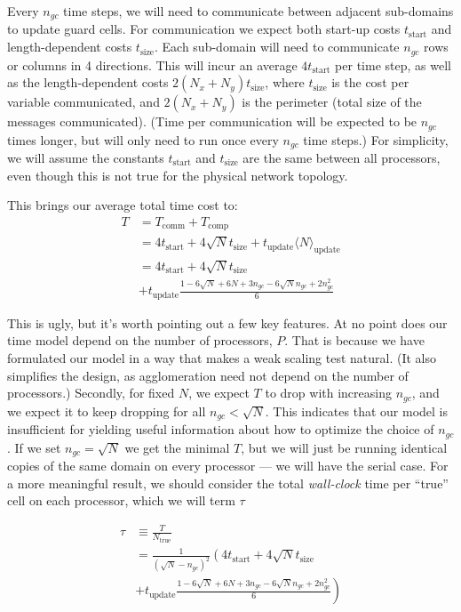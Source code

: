 \documentclass[iop, apj]{emulateapj}
\begin{document}
Every $n_{gc}$ time steps, we will need to communicate between adjacent sub-domains to update guard cells.
For communication we expect both start-up costs $t_\mathrm{start}$ and length-dependent costs $t_\mathrm{size}$.  Each sub-domain will need to communicate $n_{gc}$ rows or columns in 4 directions. This will incur an average $4 t_\mathrm{start}$ per time step, as well as the length-dependent costs $2 (N_x + N_y) t_\mathrm{size}$, where $t_\mathrm{size}$ is the cost per variable communicated, and $2 (N_x + N_y)$ is the perimeter (total size of the messages communicated). (Time per communication will be expected to be $n_{gc}$ times longer, but will only need to run once every $n_{gc}$ time steps.) For simplicity, we will assume the constants $t_\mathrm{start}$ and $t_\mathrm{size}$ are the same between all processors, even though this is not true for the physical network topology.

This brings our average total time cost to:
\begin{align}
	T &=  T_\mathrm{comm} + T_\mathrm{comp}
	\\
	&=  4 t_\mathrm{start} + 4\sqrt{N} t_\mathrm{size} + t_\mathrm{update} \langle N \rangle_\mathrm{update}
	\\
	&= 4 t_\mathrm{start} + 4\sqrt{N} t_\mathrm{size} 
	\\ \nonumber &+ t_\mathrm{update} \frac{1 - 6 \sqrt{N} + 6 N + 3 n_{gc} - 6 \sqrt{N} n_{gc} + 2 n_{gc}^2}{6}
\end{align}

This is ugly, but it's worth pointing out a few key features. At no point does our time model depend on the number of processors, $P$.  That is because we have formulated our model in a way that makes a weak scaling test natural. (It also simplifies the design, as agglomeration need not depend on the number of processors.)
Secondly, for fixed $N$, we expect $T$ to drop with increasing $n_{gc}$, and we expect it to keep dropping for all $n_{gc} < \sqrt{N}$. This indicates that our model is insufficient for yielding useful information about how to optimize the choice of $n_{gc}$.  If we set $n_{gc} = \sqrt{N}$ we get the minimal $T$, but we will just be running identical copies of the same domain on every processor --- we will have the serial case.  For a more meaningful result, we should consider the total \emph{wall-clock} time per ``true'' cell on each processor, which we will term $\tau$

\begin{align}
	\tau &\equiv \frac{T}{N_\mathrm{true}}
	\\
	&= \frac{1}{(\sqrt{N} - n_{gc})^2} \left( 4 t_\mathrm{start} + 4\sqrt{N} t_\mathrm{size} \right. \label{eq:performancemodel}
	\\ \nonumber & \left.+ t_\mathrm{update} \frac{1 - 6 \sqrt{N} + 6 N + 3 n_{gc} - 6 \sqrt{N} n_{gc} + 2 n_{gc}^2}{6} \right)
\end{align}
\end{document}
